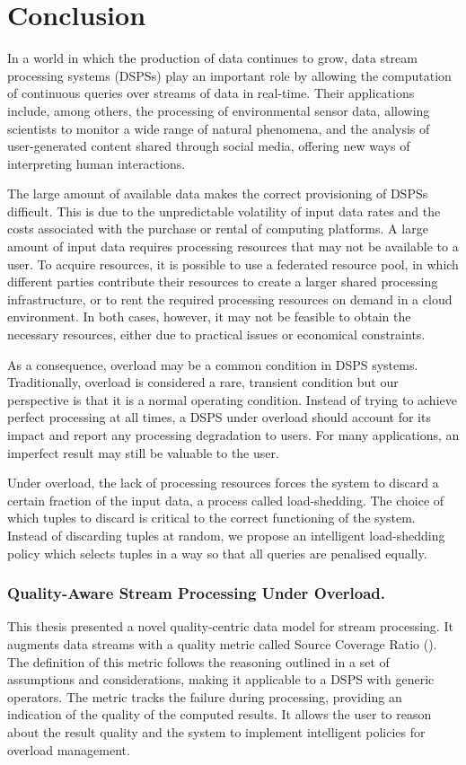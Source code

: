 \chapter{Conclusion}
\label{ch:conclusion}

In a world in which the production of data continues to grow, data stream processing systems (DSPSs) play
an important role by allowing the computation of continuous queries over streams of data in real-time.
Their applications include, among others, the processing of environmental sensor data, allowing
scientists to monitor a wide range of natural phenomena, and the analysis of user-generated content
shared through social media, offering new ways of interpreting human interactions.

The large amount of available data makes the correct provisioning of DSPSs difficult. This is
due to the unpredictable volatility of input data rates and the costs associated with the purchase or
rental of computing platforms. A large amount of input data requires processing resources that may
not be available to a user. To acquire resources, it is possible
to use a federated resource pool, in which different parties contribute their resources to
create a larger shared processing infrastructure, or to rent the required processing resources on demand
in a cloud environment. In both cases, however, it may not be feasible to obtain the necessary resources,
either due to practical issues or economical constraints.

As a consequence, overload may be a common condition in DSPS systems.
Traditionally, overload is considered a rare, transient condition but our perspective is that it is a
normal operating condition. Instead of trying to achieve perfect processing at all times, a DSPS under
overload should account for its impact and report any processing degradation to users. For many
applications, an imperfect result may still be valuable to the user.

Under overload, the lack of processing resources forces the system to discard a certain fraction of the
input data, a process called load-shedding. The choice of which tuples to discard is critical to the
correct functioning of the system.
Instead of discarding tuples at random, we propose an intelligent load-shedding
policy which selects tuples in a way so that all queries are penalised equally.

\subsection*{Quality-Aware Stream Processing Under Overload.}
\vspace{-25pt}
This thesis presented a novel quality-centric data model for stream processing. It augments
data streams with a quality metric called Source Coverage Ratio (\sic). 
The definition of this metric follows the reasoning outlined in a set of
assumptions and considerations, making it applicable to a DSPS with
generic operators.
The \sic metric tracks the failure during processing, providing an indication of the
quality of the computed results. 
It allows the user to reason about the result quality and the system to
implement intelligent policies for overload management.

